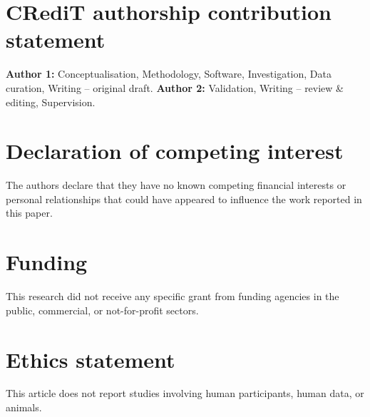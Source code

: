 \documentclass[11pt]{article}
\begin{document}

\section*{CRediT authorship contribution statement}
\textbf{Author 1:} Conceptualisation, Methodology, Software, Investigation,
Data curation, Writing -- original draft. \textbf{Author 2:} Validation,
Writing -- review \& editing, Supervision. %

\section*{Declaration of competing interest}
The authors declare that they have no known competing financial interests
or personal relationships that could have appeared to influence the work
reported in this paper.

\section*{Funding}
This research did not receive any specific grant from funding agencies in
the public, commercial, or not-for-profit sectors. %

\section*{Ethics statement}
This article does not report studies involving human participants, human
data, or animals.
\end{document}

